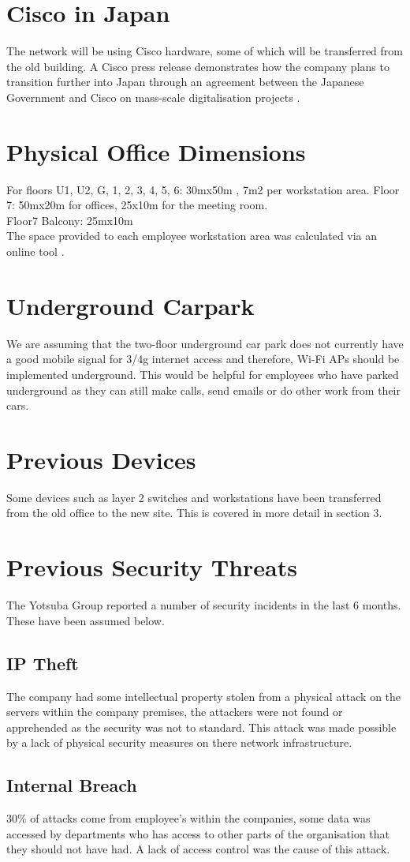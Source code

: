 \section{Cisco in Japan}
The network will be using Cisco hardware, some of which will be transferred from the old 
building. A Cisco press release demonstrates how the company plans to transition further into Japan through an agreement between the Japanese Government and Cisco on mass-scale digitalisation projects \parencite{cisco-japan}.
\section{Physical Office Dimensions}
For floors U1, U2, G, 1, 2, 3, 4, 5, 6: 30mx50m , 7m2 per workstation area.
Floor 7: 50mx20m for offices, 25x10m for the meeting room. \\
Floor7 Balcony: 25mx10m \\
The space provided to each employee workstation area was calculated via an online tool \parencite{floor-space}.
\section{Underground Carpark}
We are assuming that the two-floor underground car park does not currently have a good mobile signal for 3/4g internet access and therefore, Wi-Fi APs should be implemented underground. This  would be helpful for employees who have parked underground as they can still make calls, send emails or do other work from their cars.
\section{Previous Devices}
Some devices such as layer 2 switches and workstations have been transferred from the old office to the new site. This is covered in more detail in section 3. 
\section{Previous Security Threats}
The Yotsuba Group reported a number of security incidents in the last 6 months. These have been assumed below.
\subsection{IP Theft}
The company had some intellectual property stolen from a physical attack on the servers within the company premises, the attackers were not found or apprehended as the security was not to standard. This attack was made possible by a lack of physical security measures on there network infrastructure.
\subsection{Internal Breach}
30\% of attacks come from employee's within the companies, some data was accessed by departments who has access to other parts of the organisation that they should not have had. A lack of access control was the cause of this attack.

